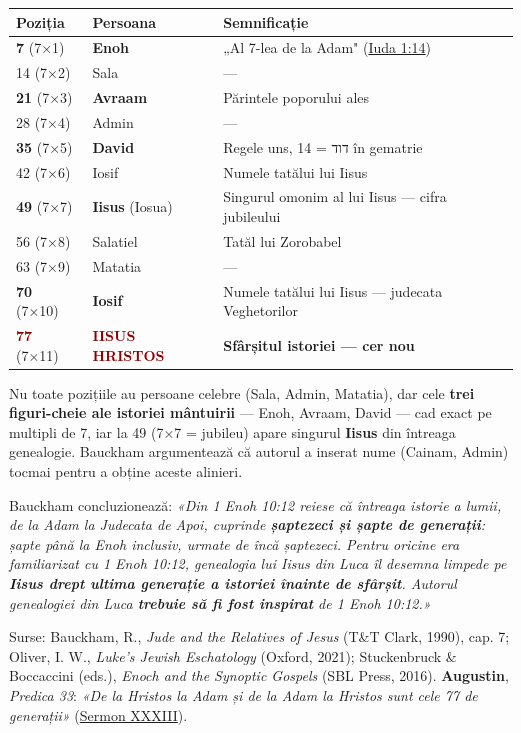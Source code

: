 \documentclass[12pt,a4paper,twoside,openany]{book}
\begin{document}
\small
\begin{longtable}{L{1.7cm}L{2.8cm}L{10.3cm}}
\toprule
{}
\textbf{Poziția} & \textbf{Persoana} & \textbf{Semnificație} \\
\midrule
\endhead
{}
\textbf{7} (7×1) & \textbf{Enoh} & „Al 7-lea de la Adam" (\href{https://bibliaortodoxa.ro/carte.php?id=44\&cap=1\#14}{Iuda 1:14}) \\
14 (7×2) & Sala & — \\
\textbf{21} (7×3) & \textbf{Avraam} & Părintele poporului ales \\
28 (7×4) & Admin & — \\
\textbf{35} (7×5) & \textbf{David} & Regele uns, דוד = 14 în gematrie \\
42 (7×6) & Iosif & Numele tatălui lui Iisus \\
\textbf{49} (7×7) & \textbf{Iisus} (Iosua) & Singurul omonim al lui Iisus — cifra jubileului \\
56 (7×8) & Salatiel & Tatăl lui Zorobabel \\
63 (7×9) & Matatia & — \\
\textbf{70} (7×10) & \textbf{Iosif} & Numele tatălui lui Iisus — judecata Veghetorilor \\
\textcolor{darkred}{\textbf{77}} (7×11) & \textcolor{darkred}{\textbf{IISUS HRISTOS}} & \textbf{Sfârșitul istoriei — cer nou} \\
\bottomrule
\end{longtable}
\normalsize
Nu toate pozițiile au persoane celebre (Sala, Admin, Matatia), dar cele \textbf{trei figuri-cheie ale istoriei mântuirii} — Enoh, Avraam, David — cad exact pe multipli de 7, iar la 49 (7×7 = jubileu) apare singurul \textbf{Iisus} din întreaga genealogie. Bauckham argumentează că autorul a inserat nume (Cainam, Admin) tocmai pentru a obține aceste alinieri.

Bauckham concluzionează: \textit{«Din 1 Enoh 10:12 reiese că întreaga istorie a lumii, de la Adam la Judecata de Apoi, cuprinde \textbf{șaptezeci și șapte de generații}: șapte până la Enoh inclusiv, urmate de încă șaptezeci. Pentru oricine era familiarizat cu 1 Enoh 10:12, genealogia lui Iisus din Luca îl desemna limpede pe \textbf{Iisus drept ultima generație a istoriei înainte de sfârșit}. Autorul genealogiei din Luca \textbf{trebuie să fi fost inspirat} de 1 Enoh 10:12.»}

Surse: Bauckham, R., \textit{Jude and the Relatives of Jesus} (T\&T Clark, 1990), cap. 7; Oliver, I. W., \textit{Luke's Jewish Eschatology} (Oxford, 2021); Stuckenbruck \& Boccaccini (eds.), \textit{Enoch and the Synoptic Gospels} (SBL Press, 2016). \textbf{Augustin}, \textit{Predica 33}: \textit{«De la Hristos la Adam și de la Adam la Hristos sunt cele 77 de generații»} (\href{https://www.newadvent.org/fathers/160333.htm}{Sermon XXXIII}).
\end{document}

